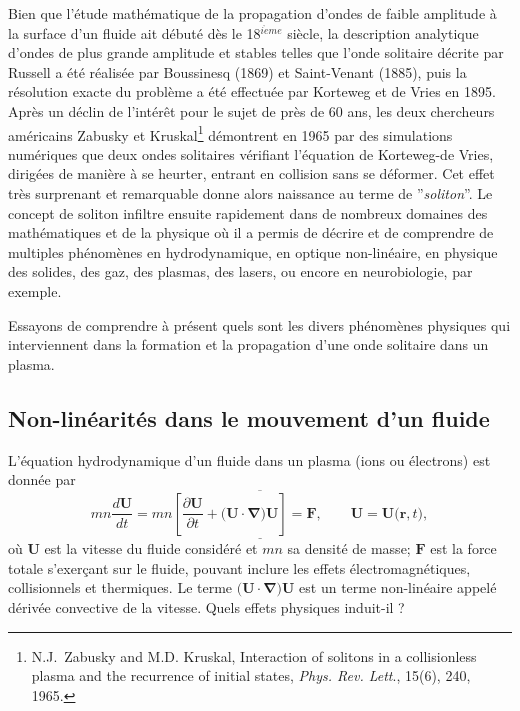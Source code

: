\documentclass[10pt,thmsa]{article}
\begin{document}
Bien que l'\'{e}tude math\'{e}matique de la propagation d'ondes de faible
amplitude \`{a} la surface d'un fluide ait d\'{e}but\'{e} d\`{e}s le
18$^{i\grave{e}me}$ si\`{e}cle, la description analytique d'ondes de plus
grande amplitude et stables telles que l'onde solitaire d\'{e}crite par
Russell a \'{e}t\'{e} r\'{e}alis\'{e}e par Boussinesq (1869) et Saint-Venant
(1885), puis la r\'{e}solution exacte du probl\`{e}me a \'{e}t\'{e}
effectu\'{e}e par Korteweg et de Vries en 1895. Apr\`{e}s un d\'{e}clin de
l'int\'{e}r\^{e}t pour le sujet de pr\`{e}s de 60 ans, les deux chercheurs
am\'{e}ricains Zabusky et Kruskal\footnote{N.J.\ Zabusky and M.D. Kruskal,
Interaction of solitons in a collisionless plasma and the recurrence of
initial states, \textit{Phys. Rev. Lett}., 15(6), 240, 1965.} d\'{e}montrent
en 1965 par des simulations num\'{e}riques que deux ondes solitaires
v\'{e}rifiant l'\'{e}quation de Korteweg-de Vries, dirig\'{e}es de mani\`{e}re
\`{a} se heurter, entrant en collision sans se d\'{e}former. Cet effet
tr\`{e}s surprenant et remarquable donne alors naissance au terme de
''\textit{soliton}''. Le concept de soliton infiltre ensuite rapidement dans
de nombreux domaines des math\'{e}matiques et de la physique o\`{u} il a
permis de d\'{e}crire et de comprendre de multiples ph\'{e}nom\`{e}nes en
hydrodynamique, en optique non-lin\'{e}aire, en physique des solides, des gaz,
des plasmas, des lasers, ou encore en neurobiologie, par exemple.

Essayons de comprendre \`{a} pr\'{e}sent quels sont les divers
ph\'{e}nom\`{e}nes physiques qui interviennent dans la formation et la
propagation d'une onde solitaire dans un plasma.

\subsection{Non-lin\'{e}arit\'{e}s dans le mouvement d'un fluide}

L'\'{e}quation hydrodynamique d'un fluide dans un plasma (ions ou
\'{e}lectrons) est donn\'{e}e par
\begin{equation}
\underline{\overline{mn\frac{d\mathbf{U}}{dt}=mn\left[  \frac{\partial
\mathbf{U}}{\partial t}+(\mathbf{U\cdot\nabla)U}\right]  \mathbf{=F,\qquad
U=U(r},t\mathbf{),}}}\label{A1}%
\end{equation}
o\`{u} $\mathbf{U}$ est la vitesse du fluide consid\'{e}r\'{e} et $mn$ sa
densit\'{e} de masse; $\mathbf{F}$ est la force totale s'exer\c{c}ant sur le
fluide, pouvant inclure les effets \'{e}lectromagn\'{e}tiques, collisionnels
et thermiques. Le terme $(\mathbf{U\cdot\nabla)U}$ est un terme
non-lin\'{e}aire appel\'{e} d\'{e}riv\'{e}e convective de la vitesse. Quels
effets physiques induit-il ?
\end{document}
